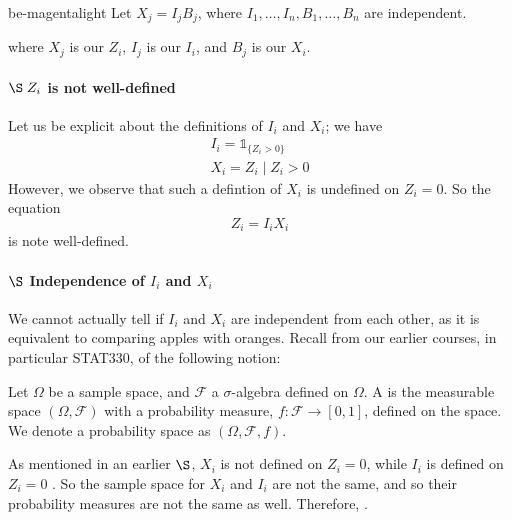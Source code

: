 \documentclass[notoc,notitlepage]{tufte-book}
\begin{document}
\begin{quotebox}{be-magenta}{light}
  Let $X_j = I_j B_j$, where $I_1, \ldots, I_n, B_1, \ldots, B_n$ are independent.
\end{quotebox}

where $X_j$ is our $Z_i$, $I_j$ is our $I_i$, and $B_j$ is our $X_i$.

\paragraph{$\S \; Z_i$ is not well-defined} Let us be explicit about the definitions of $I_i$ and $X_i$; we have
\begin{gather*}
  I_i = \mathbb{1}_{\{ Z_i > 0 \}} \\
  X_i = Z_i \mid Z_i > 0
\end{gather*}
However, we observe that such a defintion of $X_i$ is undefined on $Z_i = 0$. So the equation
\begin{equation*}
  Z_i = I_i X_i
\end{equation*}
is note well-defined.

\paragraph{$\S$ Independence of $I_i$ and $X_i$} We cannot actually tell if $I_i$ and $X_i$ are independent from each other, as it is equivalent to comparing apples with oranges. Recall from our earlier courses, in particular STAT330, of the following notion:

\begin{defnnonum}\label{defn:probability_space}
  Let $\Omega$ be a sample space, and $\mathcal{F}$ a $\sigma$-algebra defined on $\Omega$. A  is the measurable space $(\Omega, \mathcal{F})$ with a \textcolor{be-blue}{probability measure}, $f: \mathcal{F} \to [0, 1]$, defined on the space. We denote a probability space as $(\Omega, \mathcal{F}, f)$.
\end{defnnonum}

As mentioned in an earlier $\S$, $X_i$ is not defined on $Z_i = 0$, while $I_i$ is defined on $Z_i = 0$ . So the sample space for $X_i$ and $I_i$ are not the same, and so their probability measures are not the same as well. Therefore, .
\end{document}
